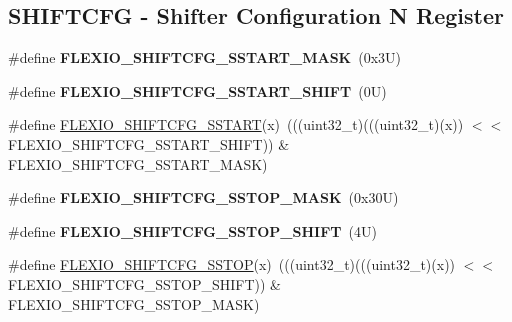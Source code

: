 \subsection*{S\+H\+I\+F\+T\+C\+FG -\/ Shifter Configuration N Register}
\begin{DoxyCompactItemize}
\item 
\mbox{\label{group___f_l_e_x_i_o___register___masks_ga1efed48eb3df27ae8ed02186c430e076}} 
\#define {\bfseries F\+L\+E\+X\+I\+O\+\_\+\+S\+H\+I\+F\+T\+C\+F\+G\+\_\+\+S\+S\+T\+A\+R\+T\+\_\+\+M\+A\+SK}~(0x3\+U)
\item 
\mbox{\label{group___f_l_e_x_i_o___register___masks_ga77db41d3e2c19cd200ae65d95b749dfd}} 
\#define {\bfseries F\+L\+E\+X\+I\+O\+\_\+\+S\+H\+I\+F\+T\+C\+F\+G\+\_\+\+S\+S\+T\+A\+R\+T\+\_\+\+S\+H\+I\+FT}~(0\+U)
\item 
\#define \mbox{\hyperlink{group___f_l_e_x_i_o___register___masks_ga83743744e18b6ecd7b3a6c7126f8aa5f}{F\+L\+E\+X\+I\+O\+\_\+\+S\+H\+I\+F\+T\+C\+F\+G\+\_\+\+S\+S\+T\+A\+RT}}(x)~(((uint32\+\_\+t)(((uint32\+\_\+t)(x)) $<$$<$ F\+L\+E\+X\+I\+O\+\_\+\+S\+H\+I\+F\+T\+C\+F\+G\+\_\+\+S\+S\+T\+A\+R\+T\+\_\+\+S\+H\+I\+FT)) \& F\+L\+E\+X\+I\+O\+\_\+\+S\+H\+I\+F\+T\+C\+F\+G\+\_\+\+S\+S\+T\+A\+R\+T\+\_\+\+M\+A\+SK)
\item 
\mbox{\label{group___f_l_e_x_i_o___register___masks_ga02f05c9b979f2b5bf46d7dabc0e49bf2}} 
\#define {\bfseries F\+L\+E\+X\+I\+O\+\_\+\+S\+H\+I\+F\+T\+C\+F\+G\+\_\+\+S\+S\+T\+O\+P\+\_\+\+M\+A\+SK}~(0x30\+U)
\item 
\mbox{\label{group___f_l_e_x_i_o___register___masks_gad97788da5fa19e7542d4cd2a53b67108}} 
\#define {\bfseries F\+L\+E\+X\+I\+O\+\_\+\+S\+H\+I\+F\+T\+C\+F\+G\+\_\+\+S\+S\+T\+O\+P\+\_\+\+S\+H\+I\+FT}~(4\+U)
\item 
\#define \mbox{\hyperlink{group___f_l_e_x_i_o___register___masks_gaee056e6aeec3126d84c55bae336b4b8f}{F\+L\+E\+X\+I\+O\+\_\+\+S\+H\+I\+F\+T\+C\+F\+G\+\_\+\+S\+S\+T\+OP}}(x)~(((uint32\+\_\+t)(((uint32\+\_\+t)(x)) $<$$<$ F\+L\+E\+X\+I\+O\+\_\+\+S\+H\+I\+F\+T\+C\+F\+G\+\_\+\+S\+S\+T\+O\+P\+\_\+\+S\+H\+I\+FT)) \& F\+L\+E\+X\+I\+O\+\_\+\+S\+H\+I\+F\+T\+C\+F\+G\+\_\+\+S\+S\+T\+O\+P\+\_\+\+M\+A\+SK)
\item 

\end{DoxyCompactItemize}

